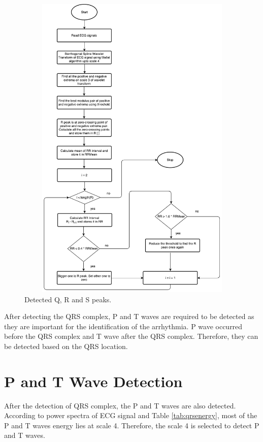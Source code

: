 \begin{figure}[htpb]
	\centering
	\includegraphics[width=15cm,height=15cm,keepaspectratio=true]{images/qrs}
	\caption{
		Detected Q, R and S peaks.
	}
	\label{fig:qrs_peaks}
\end{figure}







After detecting the QRS complex, P and T waves are required to be detected as they are important for the identification of the arrhythmia. P wave occurred before the QRS complex and T wave after the QRS complex. Therefore, they can be detected based on the QRS location.

\section{P and T Wave Detection}

After the detection of QRS complex, the P and T waves are also detected. According to power spectra of ECG signal \cite{4121752} and Table \ref{tab:qrsenergy}, most of the P and T waves energy lies at scale 4. Therefore, the scale 4 is selected to detect P and T waves. 

